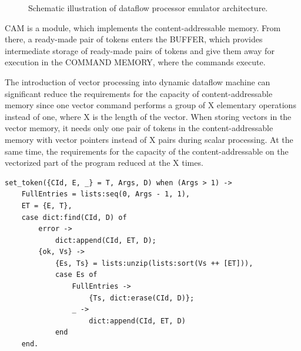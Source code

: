 \documentclass[
11pt,%
tightenlines,%
twoside,%
onecolumn,%
nofloats,%
nobibnotes,%
nofootinbib,%
superscriptaddress,%
noshowpacs,%
centertags]%
{revtex4}
\begin{document}
\begin{figure}[h!]
\setcaptionmargin{5mm}
\onelinecaptionsfalse
{}
\caption{Schematic illustration of dataflow processor emulator architecture.}
\label{fig:dataflow_emulator}
\end{figure}

CAM is a module, which implements the content-addressable memory.
From there, a ready-made pair of tokens enters the BUFFER, which provides intermediate storage of ready-made pairs of tokens and give them away for execution in the COMMAND MEMORY, where the commands execute.

The introduction of vector processing into dynamic dataflow machine can significant reduce the requirements for the capacity of content-addressable memory since one vector command performs a group of X elementary operations instead of one, where X is the length of the vector.
When storing vectors in the vector memory, it needs only one pair of tokens in the content-addressable memory with vector pointers instead of X pairs during scalar processing.
At the same time, the requirements for the capacity of the content-addressable on the vectorized part of the program reduced at the X times.

\begin{lstlisting}[caption={Implementation of the logic of the contest-addressable token memory.},label={lst:assoc}]
set_token({CId, E, _} = T, Args, D) when (Args > 1) ->
	FullEntries = lists:seq(0, Args - 1, 1),
	ET = {E, T},
	case dict:find(CId, D) of
		error ->
			dict:append(CId, ET, D);
		{ok, Vs} ->
			{Es, Ts} = lists:unzip(lists:sort(Vs ++ [ET])),
			case Es of
				FullEntries ->
					{Ts, dict:erase(CId, D)};
				_ ->
					dict:append(CId, ET, D)
			end
	end.
\end{lstlisting}
\end{document}

